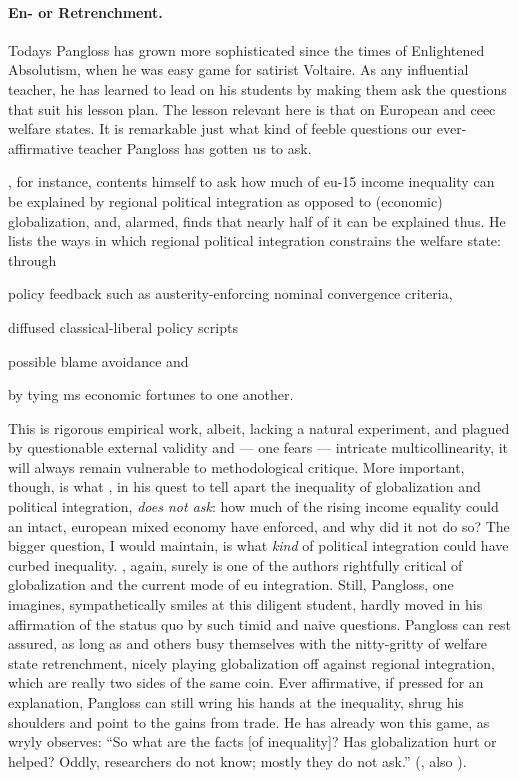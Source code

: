 \paragraph{En- or Retrenchment.}
Todays Pangloss has grown more sophisticated since the times of Enlightened Absolutism, when he was easy game for satirist Voltaire.
As any influential teacher, he has learned to lead on his students by making them ask the questions that suit his lesson plan.
The lesson relevant here is that on European and \gls{ceec} welfare states.
It is remarkable just what kind of feeble questions our ever-affirmative teacher Pangloss has gotten us to ask.

\cite{Beckfield2006}, for instance, contents himself to ask how much of \gls{eu}-15 income inequality can be explained by regional political integration as opposed to (economic) globalization, and, alarmed, finds that nearly half of it can be explained thus.
He lists the ways in which  regional political integration constrains the welfare state:
through
\begin{inparaenum}
	\item policy feedback such as austerity-enforcing nominal convergence criteria,
	\item diffused classical-liberal policy scripts
	\item possible blame avoidance and
	\item by tying \gls{ms} economic fortunes to one another.
\end{inparaenum}
This is rigorous empirical work, albeit, lacking a natural experiment, and plagued by questionable external validity and --- one fears --- intricate multicollinearity, it will always remain vulnerable to methodological critique.
More important, though, is what \citeauthor{Beckfield2006}, in his quest to tell apart the inequality of globalization and political integration, \emph{does not ask}:
how much of the rising income equality could an intact, european mixed economy have enforced, and why did it not do so?
The bigger question, I would maintain, is what \emph{kind} of political integration could have curbed inequality.
\citeauthor{Beckfield2006}, again, surely is one of the authors rightfully critical of globalization and the current mode of \gls{eu} integration.
Still, Pangloss, one imagines, sympathetically smiles at this diligent student, hardly moved in his affirmation of the status quo by such timid and naive questions.
Pangloss can rest assured, as long as \citeauthor{Beckfield2006} and others busy themselves with the nitty-gritty of welfare state retrenchment, nicely playing globalization off against regional integration, which are really two sides of the same coin.
Ever affirmative, if pressed for an explanation, Pangloss can still wring his hands at the inequality, shrug his shoulders and point to the gains from trade.
He has already won this game, as \citeauthor{Galbraith2002a} wryly observes:
``So what are the facts [of inequality]?
Has globalization hurt or helped?
Oddly, researchers do not know;
mostly they do not ask.'' (\citealt[11]{Galbraith2002a}, also \citealt[158]{Crouch2004}).

